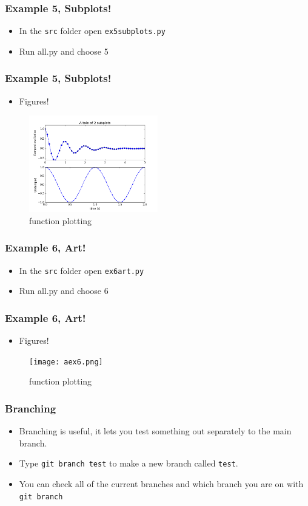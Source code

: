 \documentclass{beamer}
\begin{document}
\begin{frame}
\frametitle{Example 5, Subplots!}
\begin{itemize}
\item In the \texttt{src} folder open \texttt{ex5subplots.py} 
	\item Run all.py and choose 5 
\end{itemize}
\end{frame}

\begin{frame}
\frametitle{Example 5, Subplots!}
\begin{itemize}
\item Figures!
\end{itemize}
\begin{figure}
	\centering
	\includegraphics[width=0.5\textwidth]{ex5.png}
	\caption{function plotting}
	\label{fig:function}
\end{figure}
\end{frame}

\begin{frame}
\frametitle{Example 6, Art!}
\begin{itemize}
\item In the \texttt{src} folder open \texttt{ex6art.py} 
	\item Run all.py and choose 6 
\end{itemize}
\end{frame}

\begin{frame}
\frametitle{Example 6, Art!}
\begin{itemize}
\item Figures!
\end{itemize}
\begin{figure}
	\centering
	\texttt{[image: aex6.png]}
	\caption{function plotting}
	\label{fig:function}
\end{figure}
\end{frame}

\begin{frame}
\frametitle{Branching}
\begin{itemize}
\item Branching is useful, it lets you test something out separately to the main branch.
\item Type \texttt{git branch test} to make a new branch called \texttt{test}.
\item You can check all of the current branches and which branch you are on with \texttt{git branch}
\end{itemize}
\end{frame}
\end{document}

